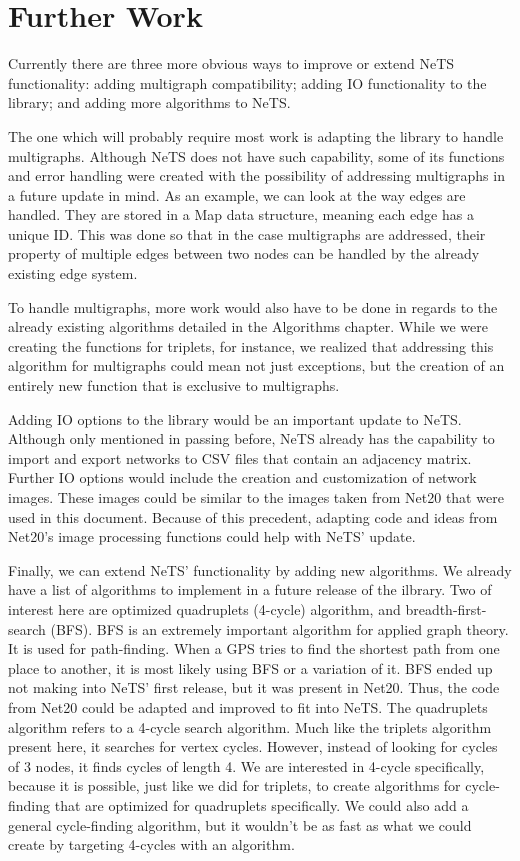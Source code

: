 \chapter{Further Work}

Currently there are three
more obvious ways to improve or extend NeTS functionality:
adding multigraph compatibility; adding IO functionality
to the library; and adding more algorithms to NeTS.

The one which will probably require most work is adapting
the library to handle multigraphs.
Although NeTS does not have such capability,
some of its functions and error handling were created with the possibility
of addressing multigraphs in a future update in mind.
As an example, we can look at the way edges are handled.
They are stored in a Map data structure, meaning each edge has a unique ID.
This was done so that in the case multigraphs are addressed,
their property of multiple edges between two nodes can be
handled by the already existing edge system.

To handle multigraphs, more work would also have to be done
in regards to the already existing algorithms detailed in the
Algorithms chapter.
While we were creating the functions for triplets, for instance,
we realized that addressing this algorithm for multigraphs
could mean not just exceptions, but the creation of an entirely new function
that is exclusive to multigraphs.

Adding IO options to the library would be an important update to NeTS.
Although only mentioned in passing before, NeTS already has
the capability to import and export networks to CSV files that
contain an adjacency matrix.
Further IO options would include the creation and customization of
network images. These images could be similar to
the images taken from Net20 that were
used in this document. Because of this precedent,
adapting code and ideas from Net20's image processing
functions could help with NeTS' update.

Finally, we can extend NeTS' functionality by adding new algorithms.
We already have a list of algorithms to implement in a
future release of the ilbrary. Two of interest here are
optimized quadruplets (4-cycle) algorithm,
and breadth-first-search (BFS).
BFS is an extremely important algorithm for applied graph theory.
It is used for path-finding. When a GPS tries to find the shortest path
from one place to another, it is most likely using BFS or a variation of it.
BFS ended up not making into NeTS' first release, but it was present
in Net20. Thus, the code from Net20 could be adapted and improved to fit
into NeTS.
The quadruplets algorithm refers to a 4-cycle search algorithm. Much like
the triplets algorithm present here, it searches for vertex cycles. However,
instead of looking for cycles of 3 nodes, it finds cycles of length 4.
We are interested in 4-cycle specifically, because
it is possible, just like we did for triplets, to create
algorithms for cycle-finding that are optimized for quadruplets specifically.
We could also add a general cycle-finding algorithm, but
it wouldn't be as fast as what we could create by targeting
4-cycles with an algorithm.
